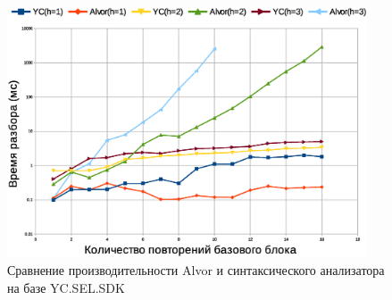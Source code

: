 \begin{figure}[h!]
 \centering
 \includegraphics[width=0.95\textwidth]{pics/AlvorVsYC.eps}
 \caption{Сравнение производительности Alvor и синтаксического анализатора на базе YC.SEL.SDK}
 \label{fig:YCvsAlvor}
\end{figure}


